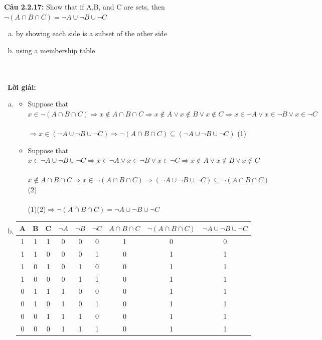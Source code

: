 \documentclass[a4paper]{article}
\begin{document}
\textbf{Câu 2.2.17: }  Show that if A,B, and C are sets, then $\lnot (A \cap B \cap C)=\lnot A \cup \lnot B \cup \lnot C$
\begin{enumerate}[a)]
\item by showing each side is a subset of the other side
\item using a membership table
\end{enumerate} \\\ \\\
\textbf{Lời giải:} \begin{enumerate}[a)]
\item
\begin{itemize}
\item Suppose that $x \in \lnot (A \cap B \cap C) 
\Rightarrow x \notin A \cap B \cap C 
\Rightarrow x \notin A \lor x \notin B \lor x \notin C
\Rightarrow x \in \lnot A \lor x \in \lnot B \lor x \in \lnot C$\\\\
$\Rightarrow x \in (\lnot A \cup \lnot B \cup \lnot C)
\Rightarrow \lnot (A \cap B \cap C) \subseteq (\lnot A \cup \lnot B \cup \lnot C)$ (1)
\item Suppose that $x \in \lnot A \cup \lnot B \cup \lnot C \Rightarrow x \in \lnot A \lor x \in \lnot B \lor x \in \lnot C \Rightarrow x \notin A \lor x \notin B \lor x \notin C$\\\\
$ x \notin A \cap B \cap C \Rightarrow x \in \lnot (A \cap B \cap C) \Rightarrow (\lnot A \cup \lnot B \cup \lnot C) \subseteq \lnot (A \cap B \cap C)$(2)\\\\
(1)(2)$\Rightarrow \lnot (A \cap B \cap C)=\lnot A \cup \lnot B \cup \lnot C$
\end{itemize}
\item \begin{tabular}{|c|c|c|c|c|c|c|c|c|}
\hline 
A & B & C & $\lnot A$ & $\lnot B$ & $\lnot C$ & $A \cap B \cap C$ & $\lnot (A \cap B \cap C)$ & $\lnot A \cup \lnot B \cup \lnot C$ \\ 
\hline 
1 & 1 & 1 & 0 & 0 & 0 & 1 & 0 & 0 \\ 
\hline 
1 & 1 & 0 & 0 & 0 & 1 & 0 & 1 & 1 \\ 
\hline 
1 & 0 & 1 & 0 & 1 & 0 & 0 & 1 & 1 \\ 
\hline 
1 & 0 & 0 & 0 & 1 & 1 & 0 & 1 & 1 \\ 
\hline 
0 & 1 & 1 & 1 & 0 & 0 & 0 & 1 & 1 \\ 
\hline 
0 & 1 & 0 & 1 & 0 & 1 & 0 & 1 & 1 \\ 
\hline 
0 & 0 & 1 & 1 & 1 & 0 & 0 & 1 & 1 \\ 
\hline 
0 & 0 & 0 & 1 & 1 & 1 & 0 & 1 & 1 \\ 
\hline 
\end{tabular} 
\end{enumerate} \\\ \\\
\clearpage
\end{document}
